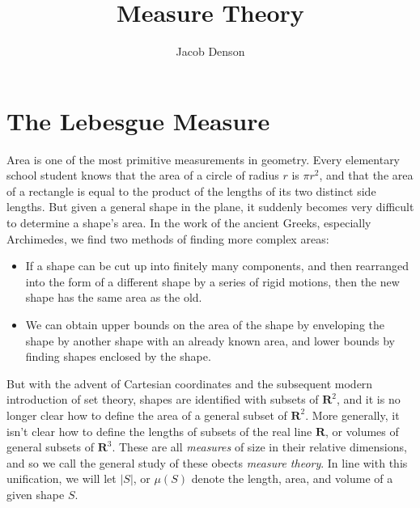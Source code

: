 

\title{Measure Theory}
\author{Jacob Denson}




\maketitle

\tableofcontents


\chapter{The Lebesgue Measure}

Area is one of the most primitive measurements in geometry. Every elementary school student knows that the area of a circle of radius $r$ is $\pi r^2$, and that the area of a rectangle is equal to the product of the lengths of its two distinct side lengths. But given a general shape in the plane, it suddenly becomes very difficult to determine a shape's area. In the work of the ancient Greeks, especially Archimedes, we find two methods of finding more complex areas:
%
\begin{itemize}
    \item If a shape can be cut up into finitely many components, and then rearranged into the form of a different shape by a series of rigid motions, then the new shape has the same area as the old.

    \item We can obtain upper bounds on the area of the shape by enveloping the shape by another shape with an already known area, and lower bounds by finding shapes enclosed by the shape.
\end{itemize}
%
But with the advent of Cartesian coordinates and the subsequent modern introduction of set theory, shapes are identified with subsets of $\mathbf{R}^2$, and it is no longer clear how to define the area of a general subset of $\mathbf{R}^2$. More generally, it isn't clear how to define the lengths of subsets of the real line $\mathbf{R}$, or volumes of general subsets of $\mathbf{R}^3$. These are all {\it measures} of size in their relative dimensions, and so we call the general study of these obects {\it measure theory}. In line with this unification, we will let $|S|$, or $\mu(S)$ denote the length, area, and volume of a given shape $S$.


